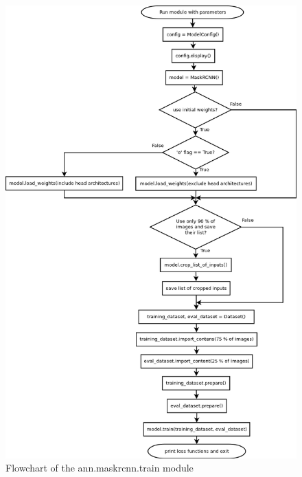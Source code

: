 \begin{figure}[H]
   \centering
	\includegraphics[width=0.95\linewidth]{./pictures/train_dia.png}
	\caption[ann.maskrcnn.train flowchart]{Flowchart of the ann.maskrcnn.train module}
      \label{fig:train}
\end{figure}

